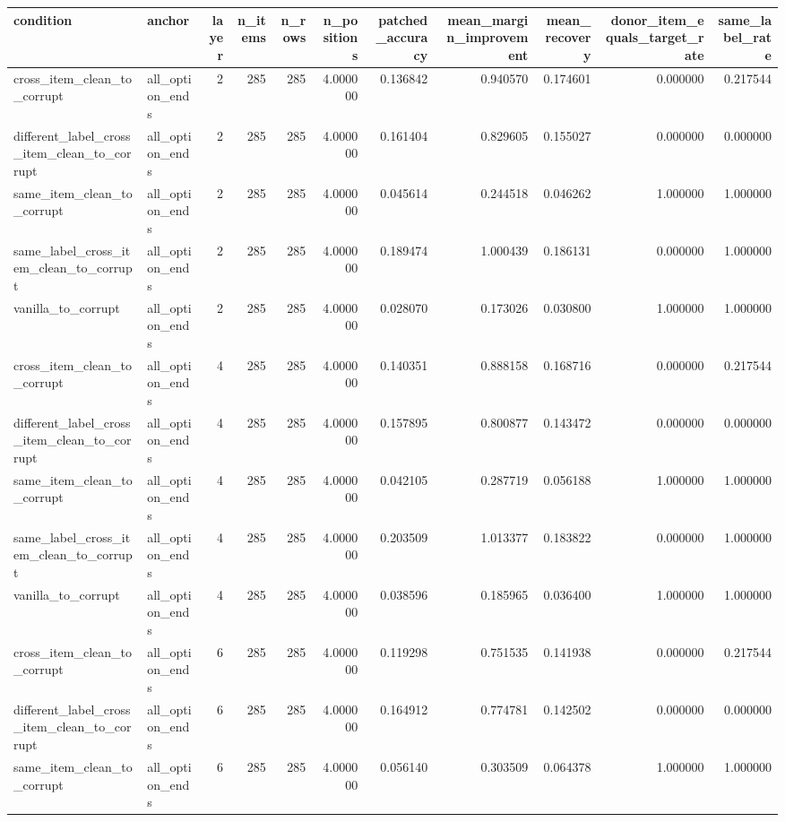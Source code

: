 \begin{tabular}{llrrrrrrrrr}
\toprule
condition & anchor & layer & n\_items & n\_rows & n\_positions & patched\_accuracy & mean\_margin\_improvement & mean\_recovery & donor\_item\_equals\_target\_rate & same\_label\_rate \\
\midrule
cross\_item\_clean\_to\_corrupt & all\_option\_ends & 2 & 285 & 285 & 4.000000 & 0.136842 & 0.940570 & 0.174601 & 0.000000 & 0.217544 \\
different\_label\_cross\_item\_clean\_to\_corrupt & all\_option\_ends & 2 & 285 & 285 & 4.000000 & 0.161404 & 0.829605 & 0.155027 & 0.000000 & 0.000000 \\
same\_item\_clean\_to\_corrupt & all\_option\_ends & 2 & 285 & 285 & 4.000000 & 0.045614 & 0.244518 & 0.046262 & 1.000000 & 1.000000 \\
same\_label\_cross\_item\_clean\_to\_corrupt & all\_option\_ends & 2 & 285 & 285 & 4.000000 & 0.189474 & 1.000439 & 0.186131 & 0.000000 & 1.000000 \\
vanilla\_to\_corrupt & all\_option\_ends & 2 & 285 & 285 & 4.000000 & 0.028070 & 0.173026 & 0.030800 & 1.000000 & 1.000000 \\
cross\_item\_clean\_to\_corrupt & all\_option\_ends & 4 & 285 & 285 & 4.000000 & 0.140351 & 0.888158 & 0.168716 & 0.000000 & 0.217544 \\
different\_label\_cross\_item\_clean\_to\_corrupt & all\_option\_ends & 4 & 285 & 285 & 4.000000 & 0.157895 & 0.800877 & 0.143472 & 0.000000 & 0.000000 \\
same\_item\_clean\_to\_corrupt & all\_option\_ends & 4 & 285 & 285 & 4.000000 & 0.042105 & 0.287719 & 0.056188 & 1.000000 & 1.000000 \\
same\_label\_cross\_item\_clean\_to\_corrupt & all\_option\_ends & 4 & 285 & 285 & 4.000000 & 0.203509 & 1.013377 & 0.183822 & 0.000000 & 1.000000 \\
vanilla\_to\_corrupt & all\_option\_ends & 4 & 285 & 285 & 4.000000 & 0.038596 & 0.185965 & 0.036400 & 1.000000 & 1.000000 \\
cross\_item\_clean\_to\_corrupt & all\_option\_ends & 6 & 285 & 285 & 4.000000 & 0.119298 & 0.751535 & 0.141938 & 0.000000 & 0.217544 \\
different\_label\_cross\_item\_clean\_to\_corrupt & all\_option\_ends & 6 & 285 & 285 & 4.000000 & 0.164912 & 0.774781 & 0.142502 & 0.000000 & 0.000000 \\
same\_item\_clean\_to\_corrupt & all\_option\_ends & 6 & 285 & 285 & 4.000000 & 0.056140 & 0.303509 & 0.064378 & 1.000000 & 1.000000 \\

\end{tabular}
